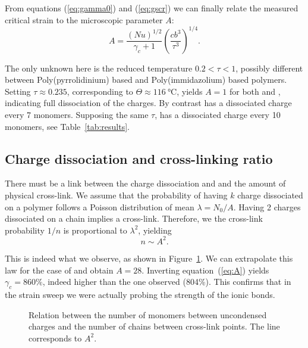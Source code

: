 \documentclass[12pt,a4paper,prl,reprint]{revtex4-1}
\begin{document}
From equations (\ref{eq:gamma0}) and (\ref{eq:gscr}) we can finally relate the measured critical strain to the microscopic parameter $A$:
\begin{equation}
A = \frac{\left(N u\right)^{1/2}}{\gamma_c+1}\left(\frac{c b^3}{\tau^3}\right)^{1/4}.
\label{eq:A}
\end{equation}

The only unknown here is the reduced temperature $0.2<\tau<1$, possibly different between Poly(pyrrolidinium) based and Poly(immidazolium) based polymers. Setting $\tau\approx 0.235$, corresponding to $\Theta\approx\SI{116}{\celsius}$, yields $A=1$ for both  and , indicating full dissociation of the charges. By contrast  has a dissociated charge every 7 monomers. Supposing the same $\tau$,  has a dissociated charge every 10 monomers, see Table~\ref{tab:results}.

\subsection{Charge dissociation and cross-linking ratio}

There must be a link between the charge dissociation and and the amount of physical cross-link. We assume that the probability of having $k$ charge dissociated on a polymer follows a Poisson distribution of mean $\lambda = N_0/A$. Having 2 charges dissociated on a chain implies a cross-link. Therefore, we the cross-link probability $1/n$ is proportional to $\lambda^2$, yielding
\begin{equation}
n \sim A^2.
\end{equation}

This is indeed what we observe, as shown in Figure~\ref{fig:nA}. We can extrapolate this law for the case of  and obtain $A = 28$. Inverting equation~(\ref{eq:A}) yields $\gamma_c = 860\%$, indeed higher than the one observed (804\%). This confirms that in the  strain sweep we were actually probing the strength of the ionic bonds.

\begin{figure}
\begin{center}
\end{center}
\caption{Relation between the number of monomers between uncondensed charges and the number of chains between cross-link points. The line corresponds to $A^2$.}
\label{fig:nA}
\end{figure}



\end{document}
